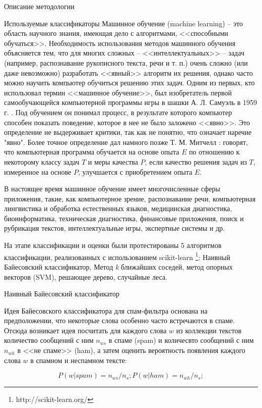\begin{section}{Описание методологии}
\begin{subsection}{Используемые классификаторы}
    Машинное обучение (machine learning) – это область научного знания, имеющая дело с алгоритмами, <<способными обучаться>>. Необходимость использования методов машинного обучения объясняется тем, что для многих сложных – <<интеллектуальных>> – задач (например, распознавание рукописного текста, речи и т. п.) очень сложно (или даже невозможно) разработать <<явный>> алгоритм их решения, однако часто можно научить компьютер обучиться решению этих задач. Одним из первых, кто использовал термин <<машинное обучение>>, был изобретатель первой самообучающейся компьютерной программы игры в шашки А. Л. Самуэль в 1959 г. \cite{Samuel}. Под обучением он понимал процесс, в результате которого компьютер способен показать поведение, которое в нее не было заложено <<явно>>. Это определение не выдерживает критики, так как не понятно, что означает наречие "явно". Более точное определение дал намного позже Т. М. Митчелл \cite{Mitchell}: говорят, что компьютерная программа обучается на основе опыта $E$ по отношению к некоторому классу задач $T$ и меры качества $P$, если качество решения задач из $T$, измеренное на основе $P$, улучшается с приобретением опыта $E$.

    В настоящее время машинное обучение имеет многочисленные сферы приложения, такие, как компьютерное зрение, распознавание речи, компьютерная лингвистика и обработка естественных языков, медицинская диагностика, биоинформатика, техническая диагностика, финансовые приложения, поиск и рубрикация текстов, интеллектуальные игры, экспертные системы и др.


    На этапе классификации и оценки были протестированы 5 алгоритмов классификации, реализованных с использованием scikit-learn \footnote{http://scikit-learn.org/}: Наивный Байесовский классификатор,
    Метод \textit{k} ближайших соседей, метод опорных векторов (SVM), решающее дерево, случайные леса.

    \begin{subsubsection}{Наивный Байесовский классификатор}

Идея Байесовского классификатора для спам-фильтра основана на предположении,
что некоторые слова особенно часто встречаются в спаме. Отсюда возникает идея посчитать для каждого слова $w$ из коллекции текстов количество сообщений с ним $n_{ws}$
в спаме (spam) и количесвто сообщений с ним $n_{wh}$ в <<не спаме>> (ham), а затем оценить вероятность появления каждого слова $w$ в спамном и неспамном тексте:

\begin{equation}
  P(w|spam) = n_{ws}/n_s; P(w|ham) = n_{wh}/n_s;
\end{equation}


\end{subsubsection}
\end{subsection}
\end{section}
